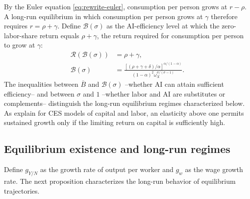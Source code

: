 By the Euler equation \eqref{eq:rewrite-euler}, consumption per person grows at $r-\rho$. A long-run equilibrium in which consumption per person grows at $\gamma$
therefore requires $r=\rho+\gamma$. Define $\mathcal B(\sigma)$ as the AI-efficiency level at which the zero-labor-share return equals $\rho+\gamma$, the return required for consumption per person to grow at $\gamma$:
\begin{equation}
 \begin{aligned}
 \mathcal R(\mathcal B(\sigma))&=\rho+\gamma,\\
 \mathcal B(\sigma)
 &=\frac{[(\rho+\gamma+\delta)/\alpha]^{\alpha/(1-\alpha)}}
 {(1-\alpha)^2\omega_X^{\sigma/(\sigma-1)}}.
 \end{aligned}
 \label{eq:rewrite-critical-frontier}
\end{equation}
The inequalities between $\overline B$ and $\mathcal B(\sigma)$ --whether AI can attain sufficient efficiency-- and between $\sigma$ and $1$ --whether labor and AI are substitutes or complements-- distinguish the long-run equilibrium regimes characterized below. As \citet[Section~2.2]{duffypapageorgiou2000} explain for CES models of capital and labor, an elasticity above one permits sustained growth only if the limiting return on capital is sufficiently high.

\subsection{Equilibrium existence and long-run regimes}
\label{subsec:rewrite-equilibrium-existence}

Define $g_{Y/N}$ as the growth rate of output per worker and $g_w$ as the wage growth rate. The next proposition characterizes the long-run behavior of equilibrium trajectories.

